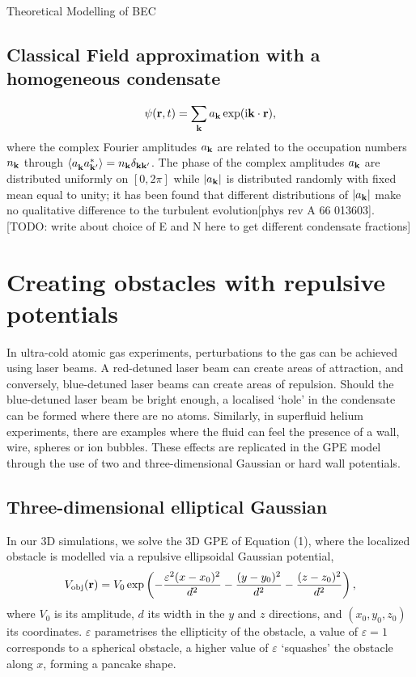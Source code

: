 \begin{chapter}{\label{cha:theoretical_model}Theoretical Modelling of BEC}
\subsection{\label{section:cfieldinit} Classical Field approximation with a homogeneous condensate}
	\begin{equation}
	\psi({\bf r},t) = \sum_{\bf k} a_{\bf k} \exp (\mathrm{i}{\bf k}\cdot{\bf r}),
	\label{eq:cFieldIC}
	\end{equation}
	where the complex Fourier amplitudes $a_{\bf k}$ are related to the occupation numbers $n_{\bf k}$ through $\braket{a_{\bf k}^{\,}a_{\bf k'}^*} = n_{\bf k}\delta_{\bf kk'}$. The phase of the complex amplitudes $a_{\bf k}$ are distributed uniformly on $[0,2\pi]$ while $|a_{\bf k}|$ is distributed randomly with fixed mean equal to unity; it has been found that different distributions of $|a_{\bf k}|$ make no qualitative difference to the turbulent evolution[phys rev A 66 013603]. [TODO: write about choice of E and N here to get different condensate fractions]

\section{\label{section:potentials}Creating obstacles with repulsive potentials}
In ultra-cold atomic gas experiments, perturbations to the gas can be achieved using laser beams. A red-detuned laser beam can create areas of attraction, and conversely, blue-detuned laser beams can create areas of repulsion. Should the blue-detuned laser beam be bright enough, a localised `hole' in the condensate can be formed where there are no atoms. Similarly, in superfluid helium experiments, there are examples where the fluid can feel the presence of a wall, wire, spheres or ion bubbles. These effects are replicated in the GPE model through the use of two and three-dimensional Gaussian or hard wall potentials.
\subsection{\label{section:3dobjpotential} Three-dimensional elliptical Gaussian}
In our 3D simulations, we solve the 3D GPE of Equation (1), where the localized obstacle is modelled via a repulsive ellipsoidal Gaussian potential,
\begin{equation}
V_{\mathrm{obj}}({\bf r})=V_0 \exp \left( -\frac{\varepsilon^2(x-x_0)^2}{d^2} -\frac{(y-y_0)^2}{d^2}-\frac{(z-z_0)^2}{d^2}\right),
\label{eq:potential3D}
\end{equation}
where  $V_0$ is its amplitude, $d$ its width in the $y$ and $z$ directions, and $(x_0,y_0,z_0)$ its coordinates. $\varepsilon$ parametrises the ellipticity of the obstacle, a value of $\varepsilon=1$ corresponds to a spherical obstacle, a higher value of $\varepsilon$ `squashes' the obstacle along $x$, forming a pancake shape.


\end{chapter}
